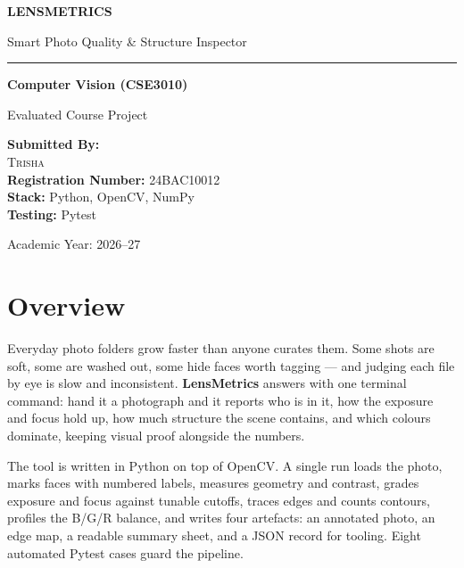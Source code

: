\documentclass[11pt,a4paper]{article}
\begin{document}
\begin{titlepage}
  \centering
  \vspace*{1.2cm}
  {\Huge\bfseries\color{ink} LENSMETRICS \par}
  \vspace{0.5cm}
  {\Large\color{teal} Smart Photo Quality \& Structure Inspector \par}
  \vspace{0.4cm}
  \textcolor{clay}{\rule{0.55\textwidth}{2pt}}
  \vspace{1.8cm}

  {\Large\bfseries Computer Vision (CSE3010) \par}
  \vspace{0.2cm}
  {\large Evaluated Course Project \par}
  \vspace{2.8cm}

  {\large
  \textbf{Submitted By:} \\[0.3em]
  {\Large\textsc{Trisha}} \\[0.2em]
  \textbf{Registration Number:} 24BAC10012 \\[0.5em]
  \textbf{Stack:} Python, OpenCV, NumPy \\[0.2em]
  \textbf{Testing:} Pytest \par}

  \vfill
  {\large Academic Year: 2026--27 \par}
  \vspace*{1cm}
\end{titlepage}

\newpage
{}
\tableofcontents
\newpage
{}

\section{Overview}
Everyday photo folders grow faster than anyone curates them. Some shots are
soft, some are washed out, some hide faces worth tagging --- and judging each
file by eye is slow and inconsistent. \textbf{LensMetrics} answers with one
terminal command: hand it a photograph and it reports who is in it, how the
exposure and focus hold up, how much structure the scene contains, and which
colours dominate, keeping visual proof alongside the numbers.

The tool is written in Python on top of OpenCV. A single run loads the photo,
marks faces with numbered labels, measures geometry and contrast, grades
exposure and focus against tunable cutoffs, traces edges and counts contours,
profiles the B/G/R balance, and writes four artefacts: an annotated photo, an
edge map, a readable summary sheet, and a JSON record for tooling. Eight
automated Pytest cases guard the pipeline.
\end{document}
